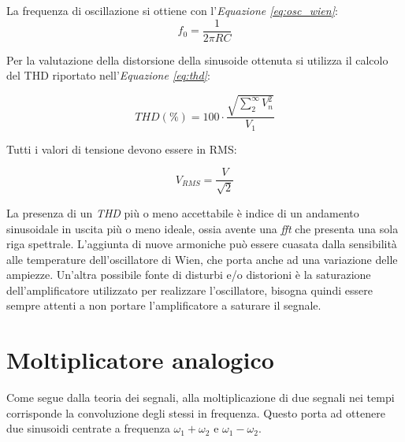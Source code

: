 \documentclass[titlepage]{report}
\begin{document}
	\noindent La frequenza di oscillazione si ottiene con l'\textit{Equazione \ref{eq:osc_wien}}:
	\begin{equation}
		\label{eq:osc_wien}
		f_0 = \frac{1}{2\pi RC}
	\end{equation}
	
	\noindent Per la valutazione della distorsione della sinusoide ottenuta si utilizza il calcolo del THD riportato nell'\textit{Equazione \ref{eq:thd}}:
	
	\begin{equation}
		\label{eq:thd}
		THD (\%) = 100 \cdot \frac{\sqrt{\sum_{2}^{\infty} V_{n}^2}}{V_1}
	\end{equation}

	\noindent Tutti i valori di tensione devono essere in RMS: 
	
	\begin{equation}
		\label{eq:Vrms}
		V_{RMS} = \frac{V}{\sqrt{2}}
	\end{equation}

	\noindent La presenza di un \textit{THD} più o meno accettabile è indice di un andamento sinusoidale in uscita più o meno ideale, ossia avente una \textit{fft} che presenta una sola riga spettrale. L'aggiunta di nuove armoniche può essere cuasata dalla sensibilità alle temperature dell'oscillatore di Wien, che porta anche ad una variazione delle ampiezze. Un'altra possibile fonte di disturbi e/o distorioni è la saturazione dell'amplificatore utilizzato per realizzare l'oscillatore, bisogna quindi essere sempre attenti a non portare l'amplificatore a saturare il segnale.


	
	
		
\newpage
\section{Moltiplicatore analogico}
	\label{sec:analog_multiplier}
	Come segue dalla teoria dei segnali, alla moltiplicazione di due segnali nei tempi corrisponde la convoluzione degli stessi in frequenza. Questo porta ad ottenere due sinusoidi centrate a frequenza $\omega_1 + \omega_2$ e $\omega_1 - \omega_2$.
	
\end{document}
